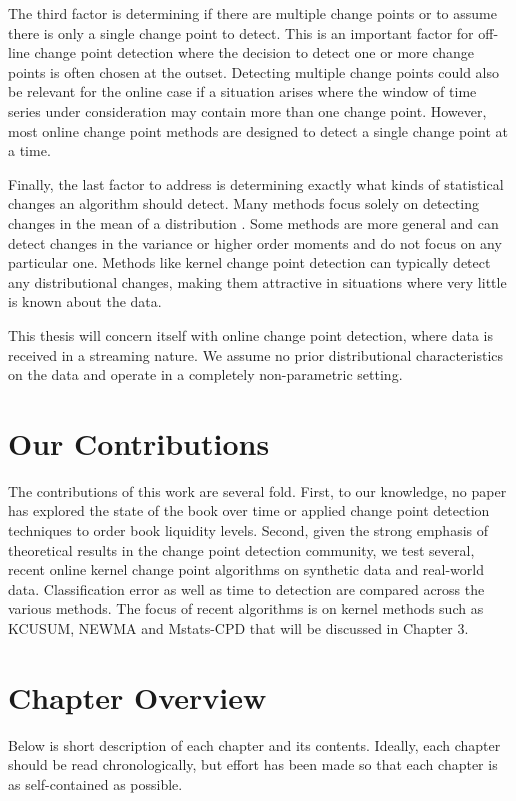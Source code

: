 The third factor is determining if there are multiple change points or to assume there is only a single change point to detect. This is an important  factor for off-line change point detection where the decision to detect one or more change points is often chosen at the outset.  Detecting multiple change points could also be relevant for the online case if a situation arises where the window of time series under consideration may contain more than one change point. However, most online change point methods are designed to detect a single change point at a time.

Finally, the last factor to address is determining exactly what kinds of statistical changes an algorithm should detect. Many methods focus solely on detecting changes in the mean of a distribution \cite{lee2010change}. Some methods are more general and can detect changes in the variance or higher order moments and do not focus on any particular one. Methods like kernel change point detection can typically detect any distributional changes, making them attractive in situations where very little is known about the data.

This thesis will concern itself with online change point detection, where data is received in a streaming nature. We assume no prior distributional characteristics on the data and operate in a completely non-parametric setting. 


\section{Our Contributions}
The contributions of this work are several fold. First, to our knowledge, no paper has explored the state of the book over time or applied change point detection techniques to order book liquidity levels. Second, given the strong emphasis of theoretical results in the change point detection community, we test several, recent online kernel change point algorithms on synthetic data and real-world data. Classification error as well as time to detection are compared across the various methods. The focus of recent algorithms is on kernel methods such as KCUSUM, NEWMA and Mstats-CPD that will be discussed in Chapter 3.

\section{Chapter Overview}
Below is short description of each chapter and its contents. Ideally, each chapter should be read chronologically, but effort has been made so that each chapter is as self-contained as possible.

